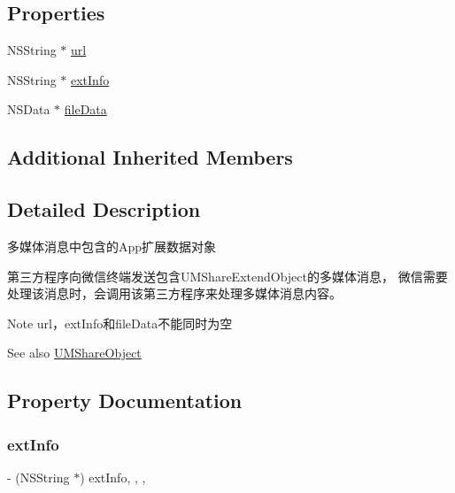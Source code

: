 \subsection*{Properties}
\begin{DoxyCompactItemize}
\item 
N\+S\+String $\ast$ \mbox{\hyperlink{interface_u_m_share_extend_object_aaa43f6d63bb8ee3c37c4e644e9fe6052}{url}}
\item 
N\+S\+String $\ast$ \mbox{\hyperlink{interface_u_m_share_extend_object_a8a67c2025357965dc1e7e4be387dcc94}{ext\+Info}}
\item 
N\+S\+Data $\ast$ \mbox{\hyperlink{interface_u_m_share_extend_object_af0ae0aa0fd9e10d33b517c25515dbc5f}{file\+Data}}
\end{DoxyCompactItemize}
\subsection*{Additional Inherited Members}


\subsection{Detailed Description}
多媒体消息中包含的\+App扩展数据对象 

第三方程序向微信终端发送包含\+U\+M\+Share\+Extend\+Object的多媒体消息， 微信需要处理该消息时，会调用该第三方程序来处理多媒体消息内容。 \begin{DoxyNote}{Note}
url，ext\+Info和file\+Data不能同时为空 
\end{DoxyNote}
\begin{DoxySeeAlso}{See also}
\mbox{\hyperlink{interface_u_m_share_object}{U\+M\+Share\+Object}} 
\end{DoxySeeAlso}


\subsection{Property Documentation}
\mbox{\label{interface_u_m_share_extend_object_a8a67c2025357965dc1e7e4be387dcc94}} 
\subsubsection{\texorpdfstring{ext\+Info}{extInfo}}
{\footnotesize\ttfamily -\/ (N\+S\+String $\ast$) ext\+Info\hspace{0.3cm}{\ttfamily [read]}, {\ttfamily [write]}, {\ttfamily [nonatomic]}, {\ttfamily [retain]}}


